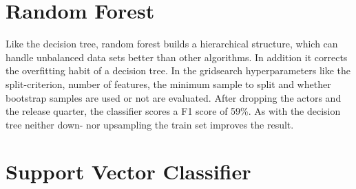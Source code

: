 \section{Random Forest}
Like the decision tree, random forest builds  a hierarchical structure, which can handle unbalanced data sets better than other algorithms. In addition it corrects the overfitting habit of a decision tree. In the gridsearch hyperparameters like the split-criterion, number of features, the minimum sample to split and whether bootstrap samples are used or not are evaluated. After dropping the actors and the release quarter, the classifier scores a F1 score of 59\%. As with the decision tree neither down- nor upsampling the train set improves the result.

\section{Support Vector Classifier}
